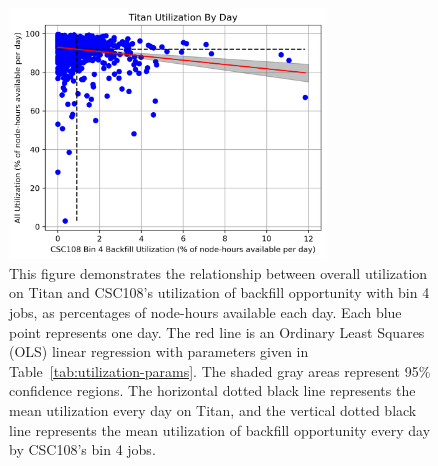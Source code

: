 \begin{figure}
  \includegraphics[width=0.75\textwidth]{images/linfit-utilization-by-true-day-bin4.png}
\caption{This figure demonstrates the relationship between overall utilization
on Titan and CSC108's utilization of backfill opportunity with bin 4 jobs, as
percentages of node-hours available each day. Each blue point represents one
day. The red line is an Ordinary Least Squares (OLS) linear regression with
parameters given in Table~\ref{tab:utilization-params}. The shaded gray areas
represent 95\% confidence regions. The horizontal dotted black line represents
the mean utilization every day on Titan, and the vertical dotted black line
represents the mean utilization of backfill opportunity every day by CSC108's
bin 4 jobs.}
\label{fig:utilization-bin4}
\end{figure}



